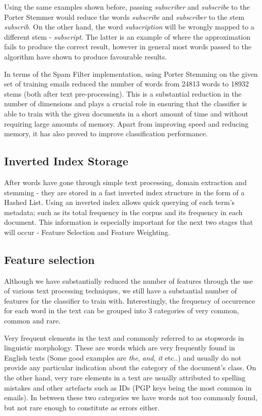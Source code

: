 Using the same examples shown before, passing \emph{subscriber} and \emph{subscribe} to the Porter Stemmer would reduce the words \emph{subscribe} and \emph{subscriber} to the stem \emph{subscrib}. On the other hand, the word \emph{subscription} will be wrongly mapped to a different stem - \emph{subscript}. The latter is an example of where the approximation fails to produce the correct result, however in general most words passed to the algorithm have shown to produce favourable results.

In terms of the Spam Filter implementation, using Porter Stemming on the given set of training emails reduced the number of words from 24813 words to 18932 stems (both after text pre-processing). This is a substantial reduction in the number of dimensions and plays a crucial role in ensuring that the classifier is able to train with the given documents in a short amount of time and without requiring large amounts of memory. Apart from improving speed and reducing memory, it has also proved to improve classification performance.

\subsection{Inverted Index Storage}

After words have gone through simple text processing, domain extraction and stemming - they are stored in a fast inverted index structure in the form of a Hashed List. Using an inverted index allows quick querying of each term's metadata; such as its total frequency in the corpus and its frequency in each document. This information is especially important for the next two stages that will occur - Feature Selection and Feature Weighting.

\subsection{Feature selection}
Although we have substantially reduced the number of features through the use of various text processing techniques, we still have a substantial number of features for the classifier to train with. Interestingly, the frequency of occurrence for each word in the text can be grouped into 3 categories of very common, common and rare. 

Very frequent elements in the text and commonly referred to as stopwords in linguistic morphology. These are words which are very frequently found in English texts (Some good examples are \emph{the}, \emph{and}, \emph{it} etc..) and usually do not provide any particular indication about the category of the document's class. On the other hand, very rare elements in a text are usually attributed to spelling mistakes and other artefacts such as IDs (PGP keys being the most common in emails). In between these two categories we have words not too commonly found, but not rare enough to constitute as errors either.

